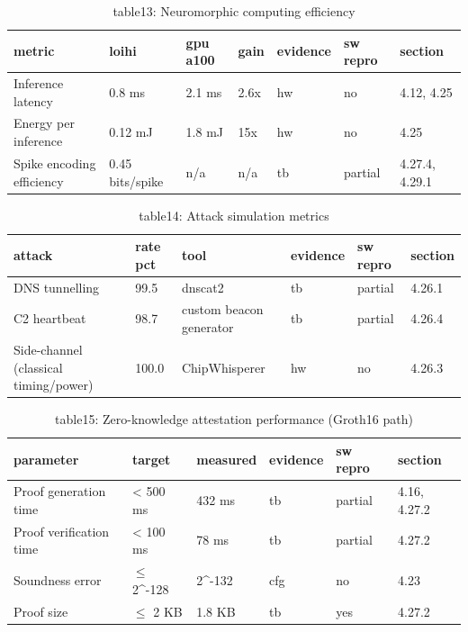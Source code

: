 \begin{table}[ht]
\centering
\small
\caption{table13: Neuromorphic computing efficiency}
\label{tab:v2:table13}
\begin{tabular}{lllllll}
\toprule
metric & loihi & gpu a100 & gain & evidence & sw repro & section \\
\midrule
Inference latency & 0.8 ms & 2.1 ms & 2.6x & hw & no & 4.12, 4.25 \\
Energy per inference & 0.12 mJ & 1.8 mJ & 15x & hw & no & 4.25 \\
Spike encoding efficiency & 0.45 bits/spike & n/a & n/a & tb & partial & 4.27.4, 4.29.1 \\
\bottomrule
\end{tabular}
\end{table}

\begin{table}[ht]
\centering
\small
\caption{table14: Attack simulation metrics}
\label{tab:v2:table14}
\begin{tabular}{llllll}
\toprule
attack & rate pct & tool & evidence & sw repro & section \\
\midrule
DNS tunnelling & 99.5 & dnscat2 & tb & partial & 4.26.1 \\
C2 heartbeat & 98.7 & custom beacon generator & tb & partial & 4.26.4 \\
Side-channel (classical timing/power) & 100.0 & ChipWhisperer & hw & no & 4.26.3 \\
\bottomrule
\end{tabular}
\end{table}

\begin{table}[ht]
\centering
\small
\caption{table15: Zero-knowledge attestation performance (Groth16 path)}
\label{tab:v2:table15}
\begin{tabular}{llllll}
\toprule
parameter & target & measured & evidence & sw repro & section \\
\midrule
Proof generation time & < 500 ms & 432 ms & tb & partial & 4.16, 4.27.2 \\
Proof verification time & < 100 ms & 78 ms & tb & partial & 4.27.2 \\
Soundness error & $\leq$ 2\^{}-128 & 2\^{}-132 & cfg & no & 4.23 \\
Proof size & $\leq$ 2 KB & 1.8 KB & tb & yes & 4.27.2 \\
\bottomrule
\end{tabular}
\end{table}

